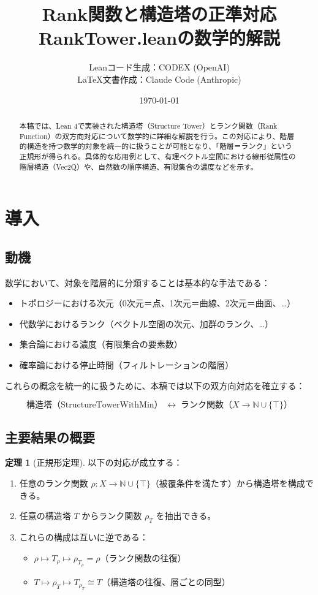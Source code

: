 \documentclass[a4paper,11pt]{ltjsarticle}
\title{Rank関数と構造塔の正準対応\\
{\large RankTower.leanの数学的解説}}
\author{%
Leanコード生成：CODEX (OpenAI)\\
\LaTeX 文書作成：Claude Code (Anthropic)%
}
\date{\today}
\theoremstyle{definition}
\newtheorem{theorem}[definition]{定理}
\begin{document}
\maketitle

\begin{abstract}
本稿では、Lean 4で実装された構造塔（Structure Tower）とランク関数（Rank Function）の双方向対応について数学的に詳細な解説を行う。この対応により、階層的構造を持つ数学的対象を統一的に扱うことが可能となり、「階層＝ランク」という正規形が得られる。具体的な応用例として、有理ベクトル空間における線形従属性の階層構造（Vec2Q）や、自然数の順序構造、有限集合の濃度などを示す。
\end{abstract}

\tableofcontents

\section{導入}

\subsection{動機}

数学において、対象を階層的に分類することは基本的な手法である：
\begin{itemize}
\item トポロジーにおける次元（0次元＝点、1次元＝曲線、2次元＝曲面、…）
\item 代数学におけるランク（ベクトル空間の次元、加群のランク、…）
\item 集合論における濃度（有限集合の要素数）
\item 確率論における停止時間（フィルトレーションの階層）
\end{itemize}

これらの概念を統一的に扱うために、本稿では以下の双方向対応を確立する：

\[
\boxed{\text{構造塔（StructureTowerWithMin）} \;\leftrightarrow\; \text{ランク関数（} X \to \mathbb{N} \cup \{\top\} \text{）}}
\]

\subsection{主要結果の概要}

\begin{theorem}[正規形定理]\label{thm:main}
以下の対応が成立する：
\begin{enumerate}
\item 任意のランク関数 $\rho : X \to \mathbb{N} \cup \{\top\}$（被覆条件を満たす）から構造塔を構成できる。
\item 任意の構造塔 $T$ からランク関数 $\rho_T$ を抽出できる。
\item これらの構成は互いに逆である：
\begin{itemize}
\item $\rho \mapsto T_\rho \mapsto \rho_{T_\rho} = \rho$（ランク関数の往復）
\item $T \mapsto \rho_T \mapsto T_{\rho_T} \cong T$（構造塔の往復、層ごとの同型）
\end{itemize}
\end{enumerate}
\end{theorem}
\end{document}
